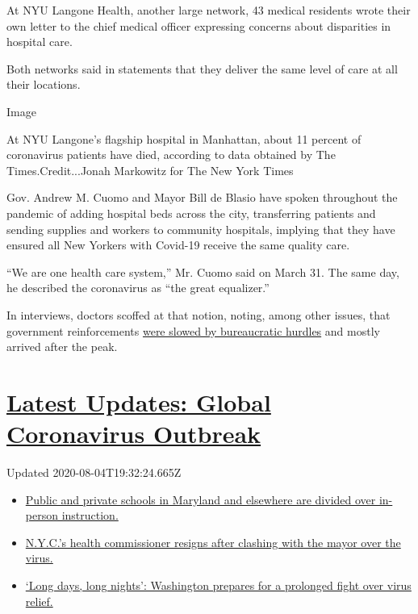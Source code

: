 At NYU Langone Health, another large network, 43 medical residents wrote
their own letter to the chief medical officer expressing concerns about
disparities in hospital care.

Both networks said in statements that they deliver the same level of
care at all their locations.

Image

At NYU Langone's flagship hospital in Manhattan, about 11 percent of
coronavirus patients have died, according to data obtained by The
Times.Credit...Jonah Markowitz for The New York Times

Gov. Andrew M. Cuomo and Mayor Bill de Blasio have spoken throughout the
pandemic of adding hospital beds across the city, transferring patients
and sending supplies and workers to community hospitals, implying that
they have ensured all New Yorkers with Covid-19 receive the same quality
care.

``We are one health care system,'' Mr. Cuomo said on March 31. The same
day, he described the coronavirus as ``the great equalizer.''

In interviews, doctors scoffed at that notion, noting, among other
issues, that government reinforcements
\href{https://www.nytimes3xbfgragh.onion/2020/04/08/nyregion/coronavirus-new-york-volunteers.html}{were
slowed by bureaucratic hurdles} and mostly arrived after the peak.

\hypertarget{latest-updates-global-coronavirus-outbreak}{%
\section{\texorpdfstring{\href{https://www.nytimes3xbfgragh.onion/2020/08/04/world/coronavirus-cases.html?action=click\&pgtype=Article\&state=default\&region=MAIN_CONTENT_1\&context=storylines_live_updates}{Latest
Updates: Global Coronavirus
Outbreak}}{Latest Updates: Global Coronavirus Outbreak}}\label{latest-updates-global-coronavirus-outbreak}}

Updated 2020-08-04T19:32:24.665Z

\begin{itemize}
\tightlist
\item
  \href{https://www.nytimes3xbfgragh.onion/2020/08/04/world/coronavirus-cases.html?action=click\&pgtype=Article\&state=default\&region=MAIN_CONTENT_1\&context=storylines_live_updates\#link-4825b93}{Public
  and private schools in Maryland and elsewhere are divided over
  in-person instruction.}
\item
  \href{https://www.nytimes3xbfgragh.onion/2020/08/04/world/coronavirus-cases.html?action=click\&pgtype=Article\&state=default\&region=MAIN_CONTENT_1\&context=storylines_live_updates\#link-4d1eafa8}{N.Y.C.'s
  health commissioner resigns after clashing with the mayor over the
  virus.}
\item
  \href{https://www.nytimes3xbfgragh.onion/2020/08/04/world/coronavirus-cases.html?action=click\&pgtype=Article\&state=default\&region=MAIN_CONTENT_1\&context=storylines_live_updates\#link-6b644638}{`Long
  days, long nights': Washington prepares for a prolonged fight over
  virus relief.}
\end{itemize}

